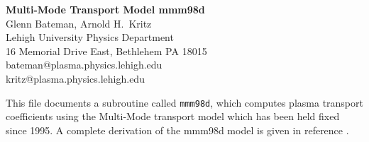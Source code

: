 %
 
\headheight 0pt \headsep 0pt  \topmargin 0pt  \oddsidemargin 0pt
\textheight 9.0in \textwidth 6.5in

\begin{center}
\Large {\bf Multi-Mode Transport Model mmm98d} \\
\vspace{1pc} \normalsize
Glenn Bateman, Arnold H.~Kritz \\
 Lehigh University Physics Department \\
16 Memorial Drive East, Bethlehem PA 18015 \\
bateman@plasma.physics.lehigh.edu \\
kritz@plasma.physics.lehigh.edu
\end{center}

This file documents a subroutine called {\tt mmm98d}, which computes
plasma transport coefficients using the Multi-Mode transport model
which has been held fixed since 1995.  A complete derivation of the
mmm98d model is given in reference \cite{bate98a}.

